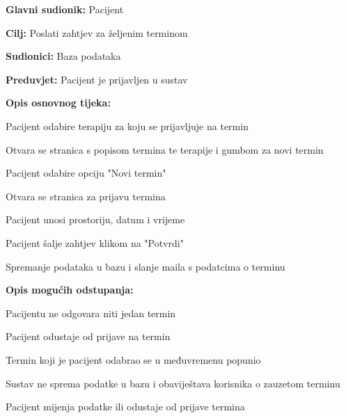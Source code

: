 				\noindent {}
				\begin{packed_item}
					
					\item \textbf{Glavni sudionik: }Pacijent
					\item  \textbf{Cilj: }Poslati zahtjev za željenim terminom
					\item  \textbf{Sudionici: }Baza podataka
					\item  \textbf{Preduvjet: }Pacijent je prijavljen u sustav
					\item  \textbf{Opis osnovnog tijeka: }
					
					\item[] \begin{packed_enum}
						
						\item Pacijent odabire terapiju za koju se prijavljuje na termin
						\item Otvara se stranica s popisom termina te terapije i gumbom za novi termin
						\item Pacijent odabire opciju "Novi termin"
						\item Otvara se stranica za prijavu termina
						\item Pacijent unosi prostoriju, datum i vrijeme
						\item Pacijent šalje zahtjev klikom na "Potvrdi"
						\item Spremanje podataka u bazu i slanje maila s podatcima o terminu
						
					\end{packed_enum}
					
					\item  \textbf{Opis mogućih odstupanja:}
					
					\item[] \begin{packed_item}
						\item[5.a] Pacijentu ne odgovara niti jedan termin
						\item[] \begin{packed_enum}
							
							\item Pacijent odustaje od prijave na termin
							
						\end{packed_enum}
						
						\item[7.a] Termin koji je pacijent odabrao se u međuvremenu popunio
						\item[] \begin{packed_enum}
							
							\item Sustav ne sprema podatke u bazu i obaviještava korisnika o zauzetom terminu
							\item Pacijent mijenja podatke ili odustaje od prijave termina
							
						\end{packed_enum}
						
					\end{packed_item}
				\end{packed_item}
				
